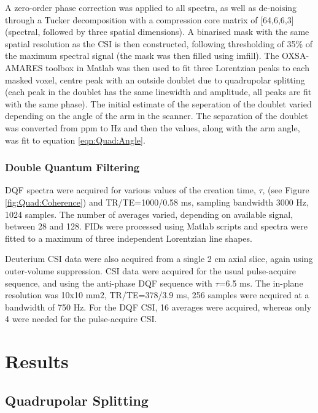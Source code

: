 \documentclass[class=article, crop=false]{standalone}
\begin{document}
A zero-order phase correction was applied to all spectra, as well as de-noising through a Tucker decomposition\cite{Bader2007EfficientTensors} with a compression core matrix of [64,6,6,3] (spectral, followed by three spatial dimensions). A binarised mask with the same spatial resolution as the CSI is then constructed, following thresholding of 35\% of the maximum spectral signal (the mask was then filled using imfill). The OXSA-AMARES toolbox in Matlab was then used to fit three Lorentzian peaks to each masked voxel, centre peak with an outside doublet due to quadrupolar splitting (each peak in the doublet has the same linewidth and amplitude, all peaks are fit with the same phase). The initial estimate of the seperation of the doublet varied depending on the angle of the arm in the scanner. The separation of the doublet was converted from ppm to Hz and then the values, along with the arm angle, was fit to equation \ref{eqn:Quad:Angle}.

\subsubsection{Double Quantum Filtering}


DQF spectra were acquired for various values of the creation time, $\tau$, (see Figure \ref{fig:Quad:Coherence}) and TR/TE=1000/0.58 ms, sampling bandwidth 3000 Hz, 1024 samples. The number of averages varied, depending on available signal, between 28 and 128. FIDs were processed using Matlab scripts and spectra were fitted to a maximum of three independent Lorentzian line shapes.

Deuterium CSI data were also acquired from a single 2 cm axial slice, again using outer-volume suppression. CSI data were acquired for the usual pulse-acquire sequence, and using the anti-phase DQF sequence with $\tau$=6.5 ms. The in-plane resolution was 10x10 mm2,  TR/TE=378/3.9 ms, 256 samples were acquired at a bandwidth of 750 Hz. For the DQF CSI, 16 averages were acquired, whereas only 4 were needed for the pulse-acquire CSI.


\section{Results}

\subsection{Quadrupolar Splitting}
\end{document}
